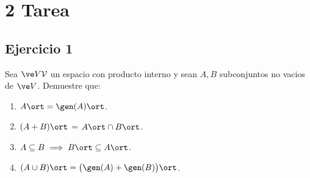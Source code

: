 

\chapter{2 Tarea}
	\section*{Ejercicio 1}
	Sea $\ve V \mathcal V$ un espacio con producto interno y sean $A,B$ subconjuntos no vacios de $\ve V$. Demuestre que:
	\begin{enumerate}
		\item $A\ort=\gen(A)\ort$. 
		\item $(A+ B)\ort$ = $A\ort\cap B\ort$.
		\item $A\subseteq B\implies B\ort\subseteq A\ort$.
		\item $(A\cup B)\ort = \big(\gen(A)+\gen(B)\big)\ort$.
	\end{enumerate}
